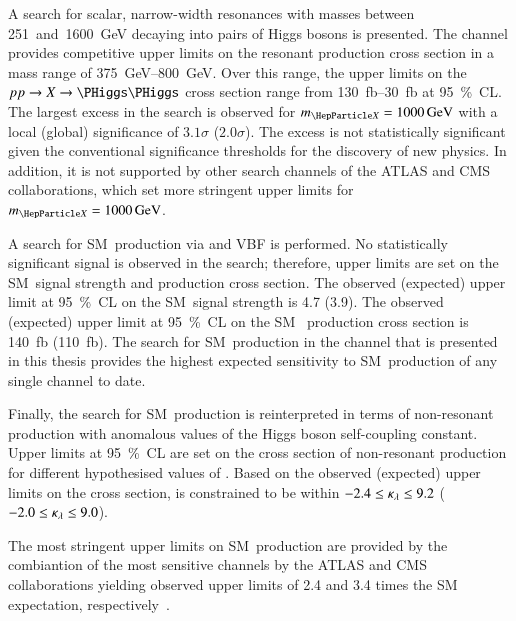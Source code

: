 A search for scalar, narrow-width resonances with masses between
\num{251}~and~\SI{1600}{\GeV} decaying into pairs of Higgs bosons is
presented. The \bbtautau channel provides competitive upper limits on the
resonant \HH production cross section in a mass range of
\SIrange{375}{800}{\GeV}. Over this range, the upper limits on the
$pp \to X \to \HH$ cross section range from \SIrange{130}{30}{\femto\barn} at
\SI{95}{\percent}~CL. The largest excess in the search is observed for
$\mX = \SI{1000}{\GeV}$ with a local (global) significance of $3.1\sigma$
($2.0\sigma$). The excess is not statistically significant given the
conventional significance thresholds for the discovery of new physics. In
addition, it is not supported by other search channels of the ATLAS and CMS
collaborations, which set more stringent upper limits for
$\mX = \SI{1000}{\GeV}$.


A search for SM~\HH production via \ggF and VBF is performed. No statistically
significant signal is observed in the search; therefore, upper limits are set on
the SM~\HH signal strength and production cross section. The observed (expected)
upper limit at \SI{95}{\percent}~CL on the SM~\HH signal strength is 4.7 (3.9).
The observed (expected) upper limit at \SI{95}{\percent}~CL on the SM~\HH
production cross section is \SI{140}{\femto\barn} (\SI{110}{\femto\barn}). The
search for SM~\HH production in the \bbtautau channel that is presented in this
thesis provides the highest expected sensitivity to SM~\HH production of any
single channel to date.


Finally, the search for SM~\HH production is reinterpreted in terms of
non-resonant \HH production with anomalous values of the Higgs boson
self-coupling constant. Upper limits at \SI{95}{\percent}~CL are set on the
cross section of non-resonant \HH production for different hypothesised values
of \klambda. Based on the observed (expected) upper limits on the cross section,
\klambda is constrained to be within $-2.4 \leq \kappa_{\lambda} \leq 9.2$
($-2.0 \leq \kappa_{\lambda} \leq 9.0$).








The most stringent upper limits on SM~\HH production are provided by the
combiantion of the most sensitive channels by the ATLAS and CMS collaborations
yielding observed upper limits of 2.4 and 3.4 times the SM expectation,
respectively~\cite{}.



